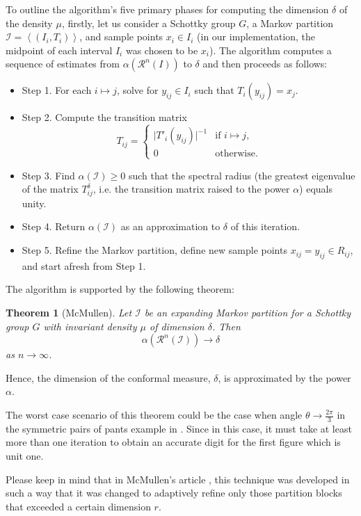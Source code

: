 \documentclass[12pt,oneside]{sfsuthesis}
\theoremstyle{plain} %
\newtheorem{theorem}{Theorem}[chapter]
\theoremstyle{definition}  %
\theoremstyle{remark}  %
\theoremstyle{plain}
\begin{document}
{To outline the algorithm's five primary phases for computing the dimension $\delta$ of the density $\mu$, firstly, let us consider a Schottky group $G$, a Markov partition $\mathcal{I}=\left\langle (I_i,T_i)\right\rangle$, and sample points $x_i\in I_i$ (in our implementation, the midpoint of each interval $I_i$ was chosen to be $x_i$). The algorithm computes a sequence of estimates from $\alpha\left( \mathcal{R}^n(I)\right)$ to $\delta$ and then proceeds as follows:
\begin{itemize}
\item Step 1. For each $i\mapsto j$, solve for $y_{ij}\in I_i$ such that $T_i(y_{ij})=x_j$.
\item Step 2. Compute the transition matrix
$$
T_{ij}=\begin{cases} 
      \vert T'_i(y_{ij}) \vert^{-1} & \text{if }i\mapsto j, \\
      0 & \text{otherwise.}
   \end{cases}
$$
\item Step 3. Find $\alpha(\mathcal{I})\geq 0$ such that the spectral radius (the greatest eigenvalue of the matrix $T_{ij}^\delta$, i.e. the transition matrix raised to the power $\alpha$) equals unity. 
\item Step 4. Return $\alpha(\mathcal{I})$ as an approximation to $\delta$ of this iteration.
\item Step 5. Refine the Markov partition, define new sample points $x_{ij}=y_{ij}\in R_{ij}$, and start afresh from Step 1.
\end{itemize}
The algorithm is supported by the following theorem\cite{mcmullen1998hausdorff}:
\begin{theorem}[McMullen]
Let $\mathcal{I}$ be an expanding Markov partition for a Schottky group $G$ with invariant density $\mu$ of dimension $\delta$. Then
$$
\alpha(\mathcal{R}^n(\mathcal{I}))\to \delta
$$
as $n\to \infty$. 
\end{theorem}
Hence, the dimension of the conformal measure, $\delta$, is approximated by the power $\alpha$.

The worst case scenario of this theorem could be the case when angle $\theta\to \frac{2\pi}{3}$ in the symmetric pairs of pants example in \cite{mcmullen1998hausdorff}. Since in this case, it must take at least more than one iteration to obtain an accurate digit for the first figure which is unit one.


Please keep in mind that in McMullen's article \cite{mcmullen1998hausdorff}, this technique was developed in such a way that it was changed to adaptively refine only those partition blocks that exceeded a certain dimension $r$.

}
\end{document}
